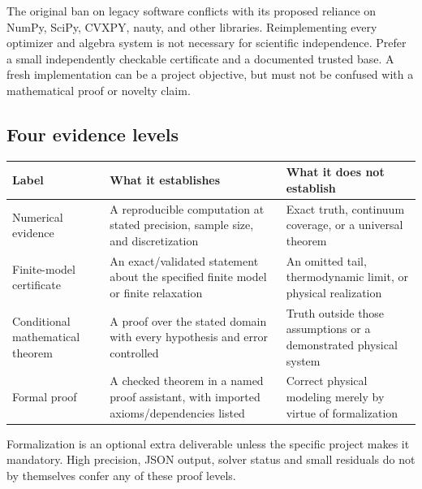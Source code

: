 \documentclass[
  11pt,
]{article}
\newcounter{none} %
\begin{document}
The original ban on legacy software conflicts with its proposed reliance
on NumPy, SciPy, CVXPY, nauty, and other libraries. Reimplementing every
optimizer and algebra system is not necessary for scientific
independence. Prefer a small independently checkable certificate and a
documented trusted base. A fresh implementation can be a project
objective, but must not be confused with a mathematical proof or novelty
claim.

\subsection{Four evidence levels}

{\def\LTcaptype{none} %
\begin{longtable}[]{@{}
  >{\raggedright\arraybackslash}p{}
  >{\raggedright\arraybackslash}p{}
  >{\raggedright\arraybackslash}p{}@{}}
\toprule\noalign{}
\begin{minipage}[b]{\linewidth}\raggedright
Label
\end{minipage} & \begin{minipage}[b]{\linewidth}\raggedright
What it establishes
\end{minipage} & \begin{minipage}[b]{\linewidth}\raggedright
What it does not establish
\end{minipage} \\
\midrule\noalign{}
\endhead
\bottomrule\noalign{}
\endlastfoot
Numerical evidence & A reproducible computation at stated precision,
sample size, and discretization & Exact truth, continuum coverage, or a
universal theorem \\
Finite-model certificate & An exact/validated statement about the
specified finite model or finite relaxation & An omitted tail,
thermodynamic limit, or physical realization \\
Conditional mathematical theorem & A proof over the stated domain with
every hypothesis and error controlled & Truth outside those assumptions
or a demonstrated physical system \\
Formal proof & A checked theorem in a named proof assistant, with
imported axioms/dependencies listed & Correct physical modeling merely
by virtue of formalization \\
\end{longtable}
}

Formalization is an optional extra deliverable unless the specific
project makes it mandatory. High precision, JSON output, solver status
and small residuals do not by themselves confer any of these proof
levels.
\end{document}
